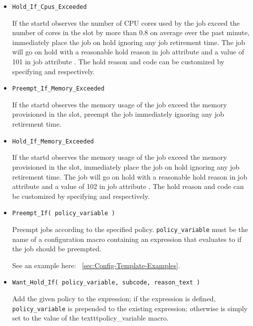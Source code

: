 \begin{description}
\begin{itemize}
	\item \texttt{Hold\_If\_Cpus\_Exceeded}

	If the startd observes the number of CPU cores used by the job exceed
	the number of cores in the slot by more than 0.8 on average over the past
	minute, immediately place the job on hold
	ignoring any job retirement time.  The job will go on hold with a reasonable
	hold reason in job attribute  and a value of 101 in job
	attribute .  The hold reason and code can be customized by
	specifying  and
	 respectively.

	\item \texttt{Preempt\_If\_Memory\_Exceeded}

	If the startd observes the memory usage of the job exceed
	the memory provisioned in the slot, preempt the job immediately
	ignoring any job retirement time.

	\item \texttt{Hold\_If\_Memory\_Exceeded}

	If the startd observes the memory usage of the job exceed
	the memory provisioned in the slot,
	immediately place the job on hold
	ignoring any job retirement time.
	The job will go on hold with a reasonable
	hold reason in job attribute  and a value of 102 in job
	attribute .  The hold reason and code can be customized by
	specifying  and
	 respectively.

	\item \texttt{Preempt\_If( policy\_variable )}

	Preempt jobs according to the specified policy.
	\texttt{policy\_variable} must be the name of a configuration macro
	containing an expression that evaluates to  if the job
	should be preempted.

	See an example here: ~\ref{sec:Config-Template-Examples}.

	\item \texttt{Want\_Hold\_If( policy\_variable, subcode, reason\_text )}

	Add the given policy to the  expression; if the
	 expression is defined, \texttt{policy\_variable}
	is prepended to the existing expression; otherwise
	 is simply set to the value of the
	texttt{policy\_variable} macro.


\end{itemize}
\end{description}
